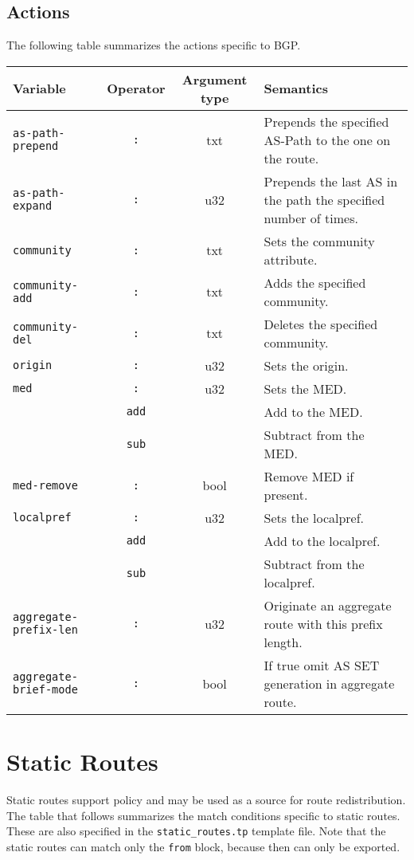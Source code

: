 \subsection{Actions}
The following table summarizes the actions specific to BGP.
\begin{center}
\begin{tabular}{|l|c|c|p{7cm}|}
\hline
Variable & Operator & Argument type & Semantics \\
\hline\hline
{\tt as-path-prepend} & {\tt :} & txt & Prepends the specified AS-Path to the
one on the route. \\
{\tt as-path-expand} & {\tt :} & u32 & Prepends the last AS in the path the
specified number of times. \\
\hline
{\tt community} & {\tt :} & txt &  Sets the community attribute.\\
{\tt community-add} & {\tt :} & txt & Adds the specified community. \\
\hline
{\tt community-del} & {\tt :} & txt & Deletes the specified community. \\
\hline
{\tt origin} & {\tt :} & u32 & Sets the origin. \\
\hline
{\tt med} & {\tt :} & u32 & Sets the MED. \\
 & {\tt add} &  & Add to the MED. \\
 & {\tt sub} &  & Subtract from the MED. \\
\hline
{\tt med-remove} & {\tt :} & bool & Remove MED if present. \\
\hline
{\tt localpref} & {\tt :} & u32 & Sets the localpref. \\
 & {\tt add} &  & Add to the localpref. \\
 & {\tt sub} &  & Subtract from the localpref. \\
\hline
{\tt aggregate-prefix-len} & {\tt :} & u32 & Originate an aggregate route with
this prefix length. \\
\hline
{\tt aggregate-brief-mode} & {\tt :} & bool & If true omit AS SET generation
in aggregate route. \\
\hline
\end{tabular}
\end{center}

\section{Static Routes}
Static routes support policy and may be used as a source for route
redistribution.  The table that follows summarizes the match conditions specific
to static routes.  These are also specified in the {\tt static\_routes.tp}
template file.  Note that the static routes can match only the {\tt from} block,
because then can only be exported.

